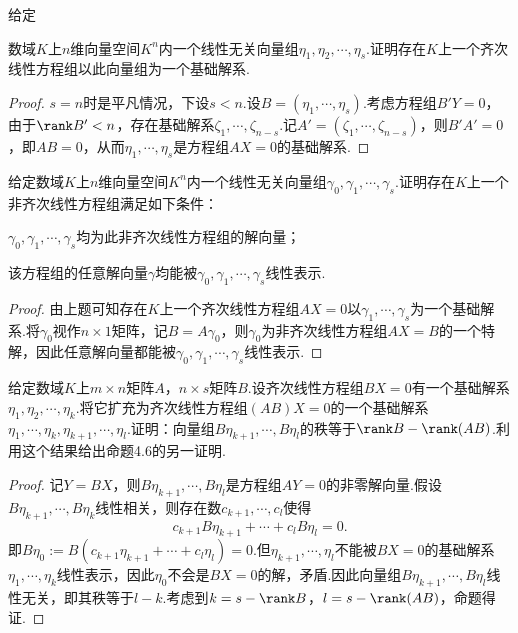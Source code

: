 \begin{prob}[13]
	\hypertarget{EquationForCertainVectors}{给定}数域$K$上$n$维向量空间$K^n$内一个线性无关向量组$\eta_1,\eta_2,\cdots,\eta_s$.证明存在$K$上一个齐次线性方程组以此向量组为一个基础解系.
\end{prob}
\begin{proof}
	$s=n$时是平凡情况，下设$s<n$.设$B=(\eta_1,\cdots,\eta_s)$.考虑方程组$B'Y=0$，由于$\rank B'<n$，存在基础解系$\zeta_1,\cdots,\zeta_{n-s}$.记$A'=(\zeta_1,\cdots,\zeta_{n-s})$，则$B'A'=0$，即$AB=0$，从而$\eta_1,\cdots,\eta_s$是方程组$AX=0$的基础解系.
\end{proof}
\begin{prob}[14]
	给定数域$K$上$n$维向量空间$K^n$内一个线性无关向量组$\gamma_0,\gamma_1,\cdots,\gamma_s$.证明存在$K$上一个非齐次线性方程组满足如下条件：
	\begin{mylist}
		\item $\gamma_0,\gamma_1,\cdots,\gamma_s$均为此非齐次线性方程组的解向量；
		\item 该方程组的任意解向量$\gamma$均能被$\gamma_0,\gamma_1,\cdots,\gamma_s$线性表示.
	\end{mylist}
\end{prob}
\begin{proof}
	由上题可知存在$K$上一个齐次线性方程组$AX=0$以$\gamma_1,\cdots,\gamma_s$为一个基础解系.将$\gamma_0$视作$n\times 1$矩阵，记$B=A\gamma_0$，则$\gamma_0$为非齐次线性方程组$AX=B$的一个特解，因此任意解向量都能被$\gamma_0,\gamma_1,\cdots,\gamma_s$线性表示.
\end{proof}
\begin{prob}[15]
	给定数域$K$上$m\times n$矩阵$A$，$n\times s$矩阵$B$.设齐次线性方程组$BX=0$有一个基础解系$\eta_1,\eta_2,\cdots,\eta_k$.将它扩充为齐次线性方程组$(AB)X=0$的一个基础解系$\eta_1,\cdots,\eta_k,\eta_{k+1},\cdots,\eta_l$.证明：向量组$B\eta_{k+1},\cdots,B\eta_l$的秩等于$\rank B-\rank(AB)$.利用这个结果给出命题4.6的另一证明.
\end{prob}
\begin{proof}
	记$Y=BX$，则$B\eta_{k+1},\cdots,B\eta_l$是方程组$AY=0$的非零解向量.假设$B\eta_{k+1},\cdots,B\eta_k$线性相关，则存在数$c_{k+1},\cdots,c_l$使得
	\[
		c_{k+1}B\eta_{k+1}+\cdots+c_lB\eta_l=0.
	\]
	即$B\eta_0:=B(c_{k+1}\eta_{k+1}+\cdots+c_l\eta_l)=0$.但$\eta_{k+1},\cdots,\eta_l$不能被$BX=0$的基础解系$\eta_1,\cdots,\eta_k$线性表示，因此$\eta_0$不会是$BX=0$的解，矛盾.因此向量组$B\eta_{k+1},\cdots,B\eta_l$线性无关，即其秩等于$l-k$.考虑到$k=s-\rank B$，$l=s-\rank(AB)$，命题得证.
\end{proof}
